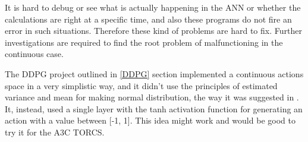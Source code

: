 It is hard to debug or see what is actually happening in the ANN or whether the calculations are right at a specific time, and also these programs do not fire an error in such situations. Therefore these kind of problems are hard to fix. Further investigations are required to find the root problem of malfunctioning in the continuous case.

The DDPG project outlined in \ref{DDPG} section implemented a continuous actions space in a very simplistic way, and it didn't use the principles of estimated variance and mean for making normal distribution, the way it was suggested in \cite{Sutton}. It, instead, used a single layer with the tanh activation function for generating an action with a value between [-1, 1]. This idea might work and would be good to try it for the A3C TORCS.